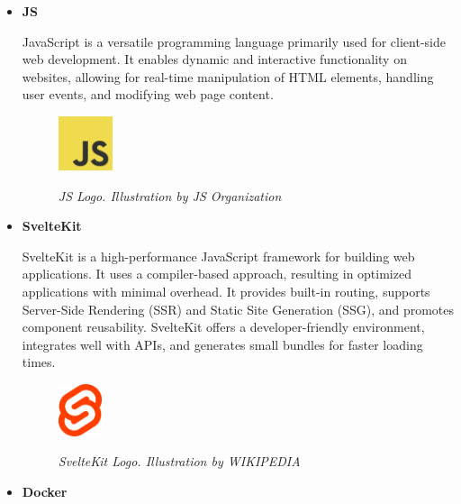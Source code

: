 \begin{itemize}
  \item \textbf{JS}

    JavaScript  is a versatile programming language primarily used for client-side web development. It enables dynamic and interactive functionality on websites, allowing for real-time manipulation of HTML elements, handling user events, and modifying web page content.

    \begin{figure}[H]
      \centering
      \begin{adjustbox}{trim=0cm 0cm, clip}
        \includegraphics[width=0.15\textwidth]{imatges/studies_and_decisions/js-logo.png}
      \end{adjustbox}
      \caption[JS Logo]{\textit{JS Logo. Illustration by JS Organization}}
      {\label{fig:js-logo}}
    \end{figure}

  \item \textbf{SvelteKit}

    SvelteKit  is a high-performance
    JavaScript framework for building web applications. It uses a
    compiler-based approach, resulting in optimized applications with minimal
    overhead. It provides built-in routing, supports Server-Side Rendering
    (SSR) and Static Site Generation (SSG), and promotes component reusability.
    SvelteKit offers a developer-friendly environment, integrates well with
    APIs, and generates small bundles for faster loading times.

    \begin{figure}[H]
      \centering
      \begin{adjustbox}{trim=0cm 0cm, clip}
        \includegraphics[width=0.12\textwidth]{imatges/studies_and_decisions/sveltekit-logo.png}
      \end{adjustbox}
      \caption[SvelteKit Logo]{\textit{SvelteKit Logo. Illustration by WIKIPEDIA}}
      {\label{fig:sveltekit-logo}}
    \end{figure}

  \item \textbf{Docker}


\end{itemize}
